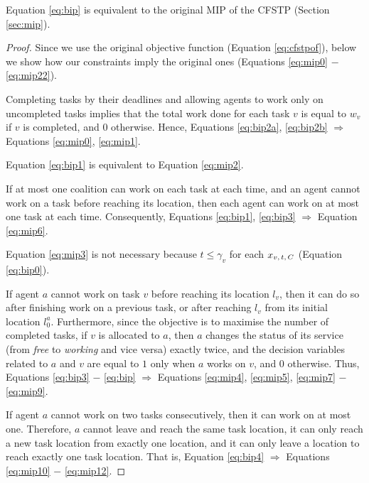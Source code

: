 \begin{theorem}\label{teo:eq}
    Equation \ref{eq:bip} is equivalent to the original MIP of the CFSTP (Section
    \ref{sec:mip}).
\end{theorem}
\begin{proof}
    Since we use the original objective function (Equation \ref{eq:cfstpof}), below we
    show how our constraints imply the original ones (Equations \ref{eq:mip0} $-$
    \ref{eq:mip22}).

    Completing tasks by their deadlines and allowing agents to work only on uncompleted
    tasks implies that the total work done for each task $v$ is equal to $w_v$ if $v$ is
    completed, and $0$ otherwise. Hence, Equations \ref{eq:bip2a}, \ref{eq:bip2b}
    $\Rightarrow$ Equations \ref{eq:mip0}, \ref{eq:mip1}.

    Equation \ref{eq:bip1} is equivalent to Equation \ref{eq:mip2}.

    If at most one coalition can work on each task at each time, and an agent cannot
    work on a task before reaching its location, then each agent can work on at most one
    task at each time. Consequently, Equations \ref{eq:bip1}, \ref{eq:bip3} $\Rightarrow$
    Equation \ref{eq:mip6}.

    Equation \ref{eq:mip3} is not necessary because $t \leq \gamma_v$ for each $x_{v,\, t,\, C}$
    (Equation \ref{eq:bip0}).

    If agent $a$ cannot work on task $v$ before reaching its location $l_v$, then it can
    do so after finishing work on a previous task, or after reaching $l_v$ from its
    initial location $l_0^a$. Furthermore, since the objective is to maximise the number
    of completed tasks, if $v$ is allocated to $a$, then $a$ changes the status of its
    service (from \emph{free} to \emph{working} and vice versa) exactly twice, and the
    decision variables related to $a$ and $v$ are equal to $1$ only when $a$ works on $v$,
    and $0$ otherwise. Thus, Equations \ref{eq:bip3} $-$ \ref{eq:bip} $\Rightarrow$
    Equations \ref{eq:mip4}, \ref{eq:mip5}, \ref{eq:mip7} $-$ \ref{eq:mip9}.

    If agent $a$ cannot work on two tasks consecutively, then it can work on at most one.
    Therefore, $a$ cannot leave and reach the same task location, it can only reach a new
    task location from exactly one location, and it can only leave a location to reach
    exactly one task location. That is, Equation \ref{eq:bip4} $\Rightarrow$ Equations
    \ref{eq:mip10} $-$ \ref{eq:mip12}.


\end{proof}
